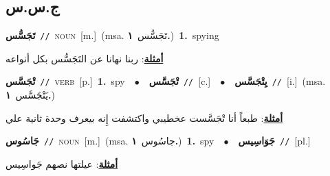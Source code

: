 \documentclass[10pt,a4paper,twoside]{article} %
\begin{document}
\begin{multicols}{2}
\vspace{-3mm}
\subsection*{\color{blue}\foreignlanguage{arabic}{ج.س.س}\color{blue}{}} 

{\setlength\topsep{0pt}\textbf{\foreignlanguage{arabic}{تَجَسُّس}}\ {\color{gray}\texttt{//}\color{black}}\ \textsc{noun}\ [m.]\ \color{gray}(msa. \foreignlanguage{arabic}{تَجَسُّس}~\foreignlanguage{arabic}{\textbf{١.}})\color{black}\ \textbf{1.}~spying\  \begin{flushright}\color{gray}\foreignlanguage{arabic}{\textbf{\underline{\foreignlanguage{arabic}{أمثلة}}}: ربنا نهانا عن التَجَسُّس بكل أنواعه}\end{flushright}\color{black}} \vspace{2mm}

{\setlength\topsep{0pt}\textbf{\foreignlanguage{arabic}{تْجَسَّس}}\ {\color{gray}\texttt{//}\color{black}}\ \textsc{verb}\ [p.]\ \textbf{1.}~spy\ \ $\bullet$\ \ \setlength\topsep{0pt}\textbf{\foreignlanguage{arabic}{تْجَسَّس}}\ {\color{gray}\texttt{//}\color{black}}\ [c.]\ \ $\bullet$\ \ \setlength\topsep{0pt}\textbf{\foreignlanguage{arabic}{يِتْجَسَّس}}\ {\color{gray}\texttt{//}\color{black}}\ [i.]\ \color{gray}(msa. \foreignlanguage{arabic}{يَتْجَسَّس}~\foreignlanguage{arabic}{\textbf{١.}})\color{black}\  \begin{flushright}\color{gray}\foreignlanguage{arabic}{\textbf{\underline{\foreignlanguage{arabic}{أمثلة}}}: طبعاً أنا تْجَسَّست عخطيبي واكتشفت إِنه بيعرف وحدة ثانية علي}\end{flushright}\color{black}} \vspace{2mm}

{\setlength\topsep{0pt}\textbf{\foreignlanguage{arabic}{جَاسُوس}}\ {\color{gray}\texttt{//}\color{black}}\ \textsc{noun}\ [m.]\ \color{gray}(msa. \foreignlanguage{arabic}{جاسُوس}~\foreignlanguage{arabic}{\textbf{١.}})\color{black}\ \textbf{1.}~spy\ \ $\bullet$\ \ \setlength\topsep{0pt}\textbf{\foreignlanguage{arabic}{جَوَاسِيس}}\ {\color{gray}\texttt{//}\color{black}}\ [pl.]\  \begin{flushright}\color{gray}\foreignlanguage{arabic}{\textbf{\underline{\foreignlanguage{arabic}{أمثلة}}}: عيلتها نصهم جَواسِيس}\end{flushright}\color{black}} \vspace{2mm}


\end{multicols}
\end{document}
